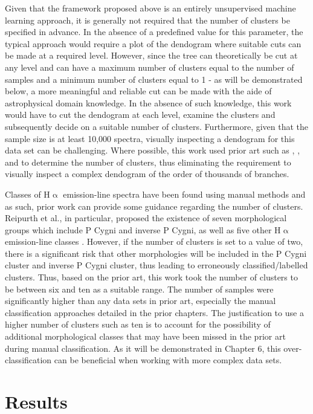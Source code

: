 Given that the framework proposed above is an entirely unsupervised machine learning approach, it is generally not required that the number of clusters be specified in advance. In the absence of a predefined value for this parameter, the typical approach would require a plot of the dendogram where suitable cuts can be made at a required level. However, since the tree can theoretically be cut at any level and can have a maximum number of clusters equal to the number of samples and a minimum number of clusters equal to 1 - as will be demonstrated below, a more meaningful and reliable cut can be made with the aide of astrophysical domain knowledge. In the absence of such knowledge, this work would have to cut the dendogram at each level, examine the clusters and subsequently decide on a suitable number of clusters. Furthermore, given that the sample size is at least 10,000 spectra, visually inspecting a dendogram for this data set can be challenging. Where possible, this work used prior art such as \citet{reipurth1996halpha}, \citet{traven2017galah}, and \citet{zhang2021catalog} to determine the number of clusters, thus eliminating the requirement to visually inspect a complex dendogram of the order of thousands of branches. 

Classes of H$\upalpha$ emission-line spectra have been found using manual methods and as such, prior work can provide some guidance regarding the number of clusters. Reipurth et al., in particular, proposed the existence of seven morphological groups which include P Cygni and inverse P Cygni, as well as five other H$\upalpha$ emission-line classes \citep{reipurth1996halpha}. However, if the number of clusters is set to a value of two, there is a significant risk that other morphologies will be included in the P Cygni cluster and inverse P Cygni cluster, thus leading to erroneously classified/labelled clusters. Thus, based on the prior art, this work took the number of clusters to be between six and ten as a suitable range. The number of samples were significantly higher than any data sets in prior art, especially the manual classification approaches detailed in the prior chapters. The justification to use a higher number of clusters such as ten is to account for the possibility of additional morphological classes that may have been missed in the prior art during manual classification. As it will be demonstrated in Chapter 6, this over-classification can be beneficial when working with more complex data sets.

\section{Results}


